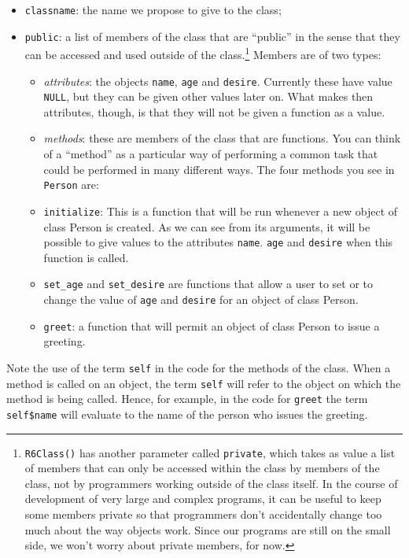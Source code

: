 \documentclass[]{book}
\providecommand{\tightlist}{%
  \setlength{\itemsep}{0pt}\setlength{\parskip}{0pt}}
\let\rmarkdownfootnote\footnote%
\def\footnote{\protect\rmarkdownfootnote}
\theoremstyle{definition}
\theoremstyle{definition}
\theoremstyle{remark}
\begin{document}
{\begin{itemize}
\tightlist
\item
  \texttt{classname}: the name we propose to give to the class;
\item
  \texttt{public}: a list of members of the class that are ``public'' in
  the sense that they can be accessed and used outside of the
  class.\footnote{\texttt{R6Class()} has another parameter called
    \texttt{private}, which takes as value a list of members that can
    only be accessed within the class by members of the class, not by
    programmers working outside of the class itself. In the course of
    development of very large and complex programs, it can be useful to
    keep some members private so that programmers don't accidentally
    change too much about the way objects work. Since our programs are
    still on the small side, we won't worry about private members, for
    now.} Members are of two types:

  \begin{itemize}
  \tightlist
  \item
    \emph{attributes}: the objects \texttt{name},
    \texttt{age} and \texttt{desire}. Currently these have value
    \texttt{NULL}, but they can be given other values later on. What
    makes then attributes, though, is that they will not be given a
    function as a value.
  \item
    \emph{methods}: these are members of the class that
    are functions. You can think of a ``method'' as a particular way of
    performing a common task that could be performed in many different
    ways. The four methods you see in \texttt{Person} are:
  \item
    \texttt{initialize}: This is a function that will be run whenever a
    new object of class Person is created. As we can see from its
    arguments, it will be possible to give values to the attributes
    \texttt{name}. \texttt{age} and \texttt{desire} when this function
    is called.
  \item
    \texttt{set\_age} and \texttt{set\_desire} are functions that allow
    a user to set or to change the value of \texttt{age} and
    \texttt{desire} for an object of class Person.
  \item
    \texttt{greet}: a function that will permit an object of class
    Person to issue a greeting.
  \end{itemize}
\end{itemize}

Note the use of the term \texttt{self} in the code for the methods of
the class. When a method is called on an object, the term \texttt{self}
will refer to the object on which the method is being called. Hence, for
example, in the code for \texttt{greet} the term \texttt{self\$name}
will evaluate to the name of the person who issues the greeting.

}
\end{document}
